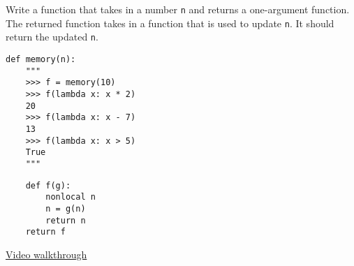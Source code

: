 \question Write a function that takes in a number \texttt{n} and returns a
one-argument function. The returned function takes in a function that is used
to update \texttt{n}. It should return the updated \texttt{n}.

\begin{lstlisting}
def memory(n):
    """
    >>> f = memory(10)
    >>> f(lambda x: x * 2)
    20
    >>> f(lambda x: x - 7)
    13
    >>> f(lambda x: x > 5)
    True
    """
\end{lstlisting}
\begin{solution}[1.5in]
  \begin{lstlisting}
    def f(g):
        nonlocal n
        n = g(n)
        return n
    return f
  \end{lstlisting}
\href{https://www.youtube.com/watch?v=XsdTV6cAAjY&vq=hd1080&t=57m50s}{Video walkthrough}
\end{solution}
